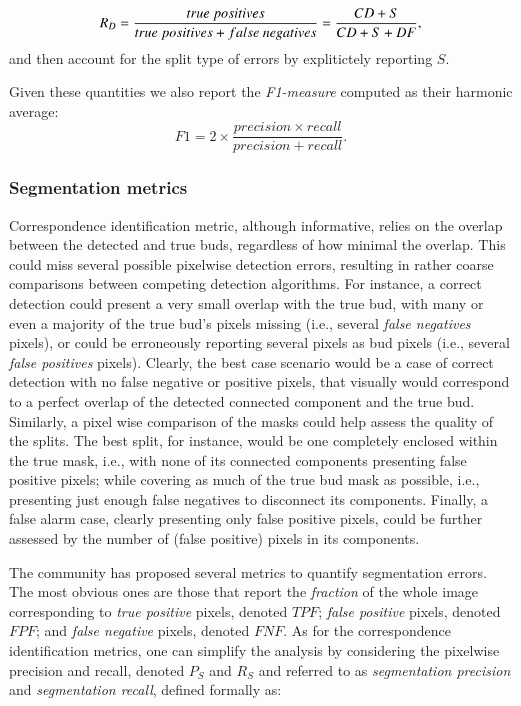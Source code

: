 \documentclass[a4paper,authoryear,review]{elsarticle}
\begin{document}
	\begin{equation}
	R_D = \frac{true\ positives}{true\ positives+false\ negatives} \\
	= \frac{CD+S}{CD+S+DF},
	\label{eq:detection-recall}
	\end{equation}
	and then account for the split type of errors by explitictely reporting $S$. 
	
	Given these quantities we also report the \emph{F1-measure} computed as their harmonic average:
	\[
	F1 = 2 \times \frac{precision \times recall}{precision + recall}.
	\] 
	
	
	\subsubsection{Segmentation metrics} \label{subsec:segmetrics}
	
	Correspondence identification metric, although informative, relies on  the overlap between the detected and true buds, regardless of how minimal the overlap. This could miss several possible pixelwise detection errors, resulting in rather coarse comparisons between competing detection algorithms. For instance, a correct detection could present a very small overlap with the true bud, with many or even a majority of the true bud’s pixels missing (i.e., several \emph{false negatives} pixels), or could be erroneously reporting several pixels as bud pixels (i.e., several \emph{false positives} pixels). Clearly, the best case scenario would be a case of correct detection with no false negative or positive pixels, that visually would correspond to a perfect overlap of the detected connected component and the true bud. 
	Similarly, a pixel wise comparison of the masks could help assess the quality of the splits. The best split, for instance, would be one completely enclosed within the true mask, i.e., with none of its connected components presenting false positive pixels; while covering as much of the true bud mask as possible, i.e., presenting just enough false negatives to disconnect its components. 
	Finally, a false alarm case, clearly presenting only false positive pixels, could be further assessed by the number of (false positive) pixels in its components. 
	
	The community has proposed several metrics to quantify segmentation errors. The most obvious ones are those that 
	report the \emph{fraction} of the whole image corresponding to \emph{true positive} pixels, denoted $TPF$; \emph{false positive} pixels,  denoted $FPF$;  and \emph{false negative} pixels, denoted $FNF$. 
	As for the correspondence identification metrics, one can simplify the analysis by considering the  pixelwise precision and recall, denoted $P_S$ and $R_S$ and referred to as \emph{segmentation precision}  and \emph{segmentation recall}, defined formally as: 
	
\end{document}
